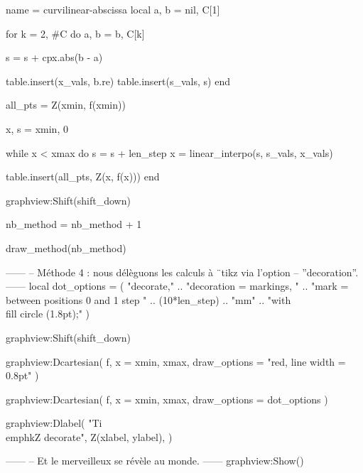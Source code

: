 \documentclass{standalone}
\begin{document}
\begin{luadraw}{name = curvilinear-abscissa}
local a, b = nil, C[1]

for k = 2, #C do
  a, b = b, C[k]

  s = s + cpx.abs(b - a)

  table.insert(x_vals, b.re)
  table.insert(s_vals, s)
end

all_pts = {Z(xmin, f(xmin))}

x, s = xmin, 0

while x < xmax do
  s = s + len_step
  x = linear_interpo(s, s_vals, x_vals)

  table.insert(all_pts, Z(x, f(x)))
end

graphview:Shift(shift_down)

nb_method = nb_method + 1

draw_method(nb_method)

------
-- Méthode 4 : nous délèguons les calculs à ¨tikz via l'option
-- ''decoration''.
------
local dot_options = (
     "decorate,"
  .. "decoration = {markings, "
  .. "mark = between positions 0 and 1 step "
  .. (10*len_step) .. "mm"
  .. "with {\\fill circle (1.8pt);}}"
)

graphview:Shift(shift_down)

graphview:Dcartesian(
  f,
  {
    x = {xmin, xmax},
    draw_options = "red, line width = 0.8pt"
  }
)

graphview:Dcartesian(
  f,
  {
    x = {xmin, xmax},
    draw_options = dot_options
  }
)

graphview:Dlabel(
  "Ti\\emph{k}Z decorate", Z(xlabel, ylabel), {}
)

------
-- Et le merveilleux se révèle au monde.
------
graphview:Show()
\end{luadraw}
\end{document}
